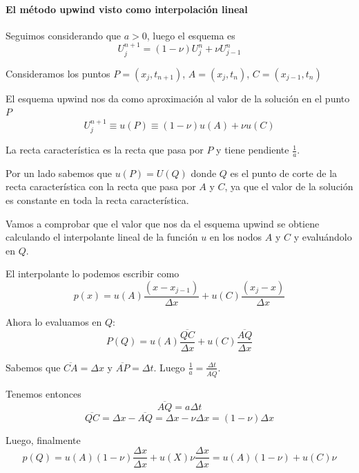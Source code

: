 \paragraph{El método upwind visto como interpolación lineal}
Seguimos considerando que $a > 0$, luego el esquema es 
$$U_j^{n+1} = (1-\nu) U_j^n+\nu U_{j-1}^n$$

Consideramos los puntos $P = (x_j, t_{n+1})$, $A = (x_j, t_n)$, $C = (x_{j-1}, t_n)$

El esquema upwind nos da como aproximación al valor de la solución en el punto $P$
$$U_j^{n+1} \equiv u(P) \equiv (1-\nu)u(A)  + \nu u(C)$$

La recta característica es la recta que pasa por $P$ y tiene pendiente $\frac{1}{a}$.

Por un lado sabemos que $u(P) = U(Q)$ donde $Q$ es el punto de corte de la recta característica con la recta que pasa por $A$ y $C$, ya que el valor de la solución es constante en toda la recta característica.

Vamos a comprobar que el valor que nos da el esquema upwind se obtiene calculando el interpolante lineal de la función $u$ en los nodos $A$ y $C$ y evaluándolo en $Q$.

El interpolante lo podemos escribir como
$$p(x) = u(A) \frac{(x-x_{j-1})}{\Delta x}+u(C) \frac{(x_j-x)}{\Delta x}$$

Ahora lo evaluamos en $Q$:
$$P(Q) = u(A)\frac{\overline{QC}}{\Delta x} + u(C)\frac{\overline{AQ}}{\Delta x}$$

Sabemos que $\overline{CA} = \Delta x$ y $\overline{AP} = \Delta t$. Luego $\frac{1}{a} = \frac{\Delta t}{\overline{AQ}}$.

Tenemos entonces
$$\overline{AQ} = a\Delta t$$
$$\overline{QC} = \Delta x - \overline{AQ} = \Delta x -\nu\Delta x = (1-\nu)\Delta x$$

Luego, finalmente
$$p(Q) = u(A)(1-\nu)\frac{\Delta x}{\Delta x} + u(X) \nu\frac{\Delta x}{\Delta x} = u(A) (1-\nu)+u(C)\nu$$